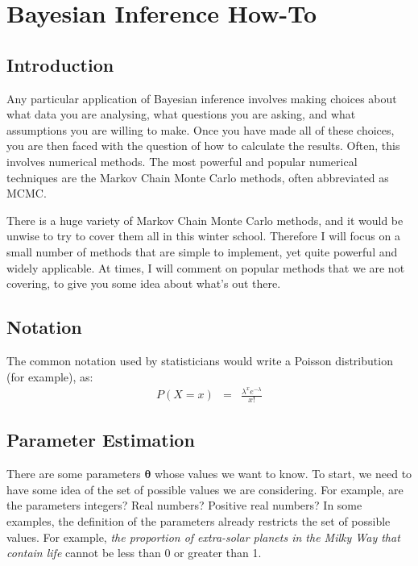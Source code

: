 \newcommand{\btheta}{\boldsymbol{\theta}}
\newcommand{\data}{\boldsymbol{D}}

\author[Lecturer1]{Brendon J. Brewer\\
Department of Statistics, The University of Auckland}

\chapter{Bayesian Inference How-To}

\section{Introduction}


Any particular application of Bayesian inference involves making choices
about what data you are analysing, what questions you are
asking, and what assumptions you are willing to make. Once you have made all
of these choices, you are then faced with the question of how to calculate the
results. Often, this involves numerical methods. The most powerful and
popular numerical techniques are the Markov Chain Monte Carlo methods, often
abbreviated as MCMC.

There is a huge variety of Markov Chain Monte Carlo methods, and it would be
unwise to try to cover them all in this winter school. Therefore I will focus
on a small number of methods that are simple to implement, yet quite powerful
and widely applicable. At times, I will comment on popular methods that we are
not covering, to give you some idea about what's out there.


\section{Notation}
The common notation used by statisticians would write a Poisson distribution
(for example), as:
\begin{eqnarray}
P(X = x) &=& \frac{\lambda^x e^{-\lambda}}{x!}
\end{eqnarray}



\section{Parameter Estimation}

There are some parameters $\btheta$ whose values we want to know. To start, we
need to have some idea of the set of possible values we are considering. For
example, are the parameters integers? Real numbers? Positive real numbers?
In some examples, the definition of the parameters already restricts the set
of possible values. For example, {\it the proportion of extra-solar planets in
the Milky Way that contain life} cannot be less than 0 or greater than 1.

